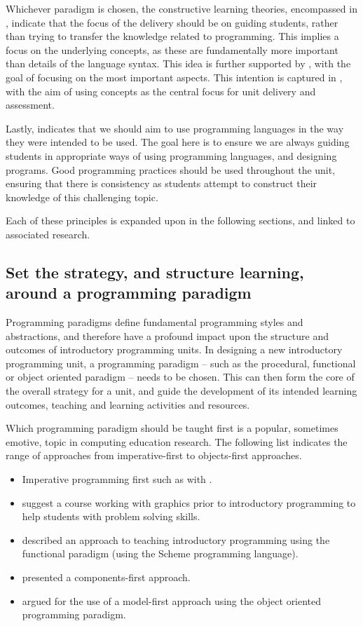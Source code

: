 Whichever paradigm is chosen, the constructive learning theories, encompassed in , indicate that the focus of the delivery should be on guiding students, rather than trying to transfer the knowledge related to programming. This implies a focus on the underlying concepts, as these are fundamentally more important than details of the language syntax. This idea is further supported by , with the goal of focusing on the most important aspects. This intention is captured in , with the aim of using concepts as the central focus for unit delivery and assessment.

Lastly,  indicates that we should aim to use programming languages in the way they were intended to be used. The goal here is to ensure we are always guiding students in appropriate ways of using programming languages, and designing programs. Good programming practices should be used throughout the unit, ensuring that there is consistency as students attempt to construct their knowledge of this challenging topic.

Each of these principles is expanded upon in the following sections, and linked to associated research.


\subsection{Set the strategy, and structure learning, around a programming paradigm} %
\label{ssub:strategy_around_paradigm}

Programming paradigms define fundamental programming styles and abstractions, and therefore have a profound impact upon the structure and outcomes of introductory programming units. In designing a new introductory programming unit, a programming paradigm -- such as the procedural, functional or object oriented paradigm -- needs to be chosen. This can then form the core of the overall strategy for a unit, and guide the development of its intended learning outcomes, teaching and learning activities and resources.

Which programming paradigm should be taught first is a popular, sometimes emotive, topic in computing education research. The following list indicates the range of approaches from imperative-first to objects-first approaches.
\begin{itemize}[noitemsep,nolistsep]
	\item Imperative programming first such as with \citet{Koffman:1988a}.
	\item \citet{Cooper:2003} suggest a course working with graphics prior to introductory programming to help students with problem solving skills.
	\item \citet{Felleisen:2004} described an approach to teaching introductory programming using the functional paradigm (using the Scheme programming language).
	\item \citet{Howe:2004} presented a components-first approach.
	\item \citet{Bennedsen:2004} argued for the use of a model-first approach using the object oriented programming paradigm.
\end{itemize}

